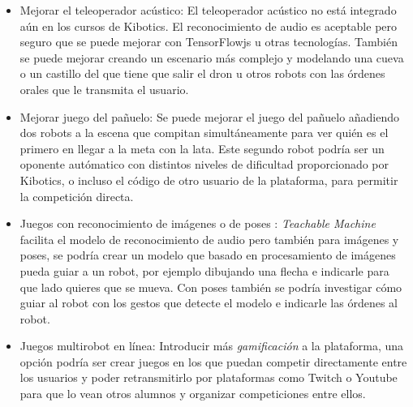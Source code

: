 \begin{itemize}
\item Mejorar el teleoperador acústico: El teleoperador acústico no está integrado aún en los cursos de  Kibotics. El reconocimiento de audio es aceptable pero seguro que se puede mejorar con TensorFlowjs u otras tecnologías. También se puede mejorar creando un escenario más complejo y modelando una cueva o un castillo del que tiene que salir el dron u otros robots con las órdenes orales que le transmita el usuario.

\item Mejorar juego del pañuelo: Se puede mejorar el juego del pañuelo añadiendo dos robots a la escena que compitan simultáneamente para ver quién es el primero en llegar a la meta con la lata. Este segundo robot podría ser un oponente autómatico con distintos niveles de dificultad proporcionado por Kibotics, o incluso el código de otro usuario de la plataforma, para permitir la competición directa.

\item  Juegos con reconocimiento de imágenes o de poses : \textit{Teachable Machine} facilita el modelo de reconocimiento de audio pero también para imágenes y poses, se podría crear un modelo que basado en procesamiento de imágenes pueda guiar a un robot, por ejemplo dibujando una flecha e indicarle para que lado quieres que se mueva. Con poses también se podría investigar cómo guiar al robot con los gestos que detecte el modelo e indicarle las órdenes al robot.

\item Juegos multirobot en línea: Introducir más \textit{gamificación} a la plataforma, una opción podría ser crear juegos en los que puedan competir directamente entre los usuarios y poder retransmitirlo por plataformas como Twitch o Youtube para que lo vean otros alumnos y organizar competiciones entre ellos.


\end{itemize}
